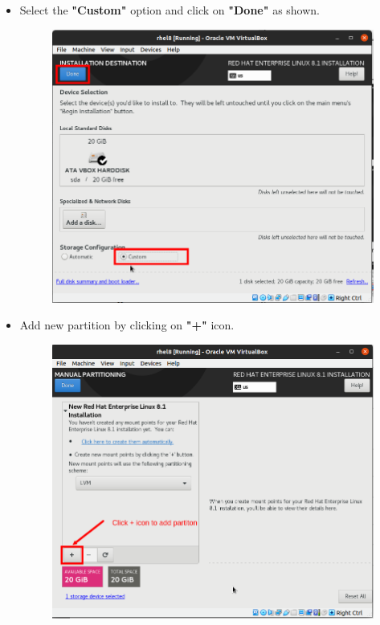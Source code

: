 \begin{flushleft}
\begin{itemize}
 	\item Select the \textbf{"Custom"} option and click on \textbf{"Done"} as shown.
	\begin{figure}[h!]
		\centering
		\includegraphics[scale=.25]{content/chapter18/images/image1.3.png}
	\end{figure}
	
 	\item Add new partition by clicking on \textbf{"+"} icon.
	\begin{figure}[h!]
		\centering
		\includegraphics[scale=.2]{content/chapter18/images/image1.5.png}
	\end{figure}
		

\end{itemize}
\end{flushleft}
